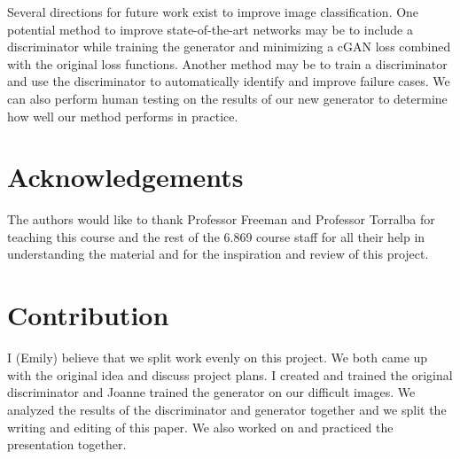 \documentclass[10pt,twocolumn,letterpaper]{article}
\begin{document}
Several directions for future work exist to improve image classification. One potential method to improve state-of-the-art networks may be to include a discriminator while training the generator and minimizing a cGAN loss combined with the original loss functions. Another method may be to train a discriminator and use the discriminator to automatically identify and improve failure cases. We can also perform human testing on the results of our new generator to determine how well our method performs in practice.

\section{Acknowledgements}

The authors would like to thank Professor Freeman and Professor Torralba for teaching this course and the rest of the 6.869 course staff for all their help in understanding the material and for the inspiration and review of this project.

\section{Contribution}

I (Emily) believe that we split work evenly on this project. We both came up with the original idea and discuss project plans. I created and trained the original discriminator and Joanne trained the generator on our difficult images. We analyzed the results of the discriminator and generator together and we split the writing and editing of this paper. We also worked on and practiced the presentation together.
\end{document}
